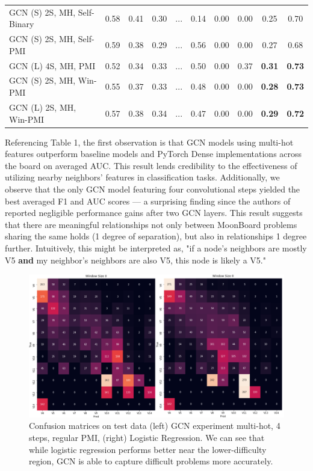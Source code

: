 \documentclass{article}
\begin{document}
\begin{table}[h!]
\begin{tabular}{@{}lccclccccc@{}}
GCN (S) 2S, MH, Self-Binary & 0.58  & 0.41  & 0.30  & ... & 0.14 & 0.00 & 0.00 & 0.25            & 0.70            \\
GCN (S) 2S, MH, Self-PMI    & 0.59  & 0.38  & 0.29  & ... & 0.56 & 0.00 & 0.00 & 0.27            & 0.68            \\
GCN (L) 4S, MH, PMI         & 0.52  & 0.34  & 0.33  & ... & 0.50 & 0.00 & 0.37 & \textbf{0.31}            & \textbf{0.73}            \\
GCN (S) 2S, MH, Win-PMI     & 0.55  & 0.37  & 0.33  & ... & 0.48 & 0.00 & 0.00 & \textbf{0.28}            & \textbf{0.73}            \\
GCN (L) 2S, MH, Win-PMI     & 0.57  & 0.38  & 0.34  & ... & 0.47 & 0.00 & 0.00 & \textbf{0.29}            & \textbf{0.72}            \\ \bottomrule
\end{tabular}
\end{table}

Referencing Table 1, the first observation is that GCN models using multi-hot features outperform baseline models and PyTorch Dense implementations across the board on averaged AUC. This result lends credibility to the effectiveness of utilizing nearby neighbors' features in classification tasks. Additionally, we observe that the only GCN model featuring four convolutional steps yielded the best averaged F1 and AUC scores --- a surprising finding since the authors of \cite{yao2018graph} reported negligible performance gains after two GCN layers. This result suggests that there are meaningful relationships not only between MoonBoard problems sharing the same holds (1 degree of separation), but also in relationships 1 degree further. Intuitively, this might be interpreted as, "if a node's neighbors are mostly V5 \textbf{and} my neighbor's neighbors are also V5, this node is likely a V5."

\begin{figure}[h]
\centering
\includegraphics[width=.65\textwidth]{confusions}

\label{fig: Confusion matrices}
\caption{Confusion matrices on test data (left) GCN experiment multi-hot, 4 steps, regular PMI, (right) Logistic Regression. We can see that while logistic regression performs better near the lower-difficulty region, GCN is able to capture difficult problems more accurately.}
\end{figure}
\end{document}
